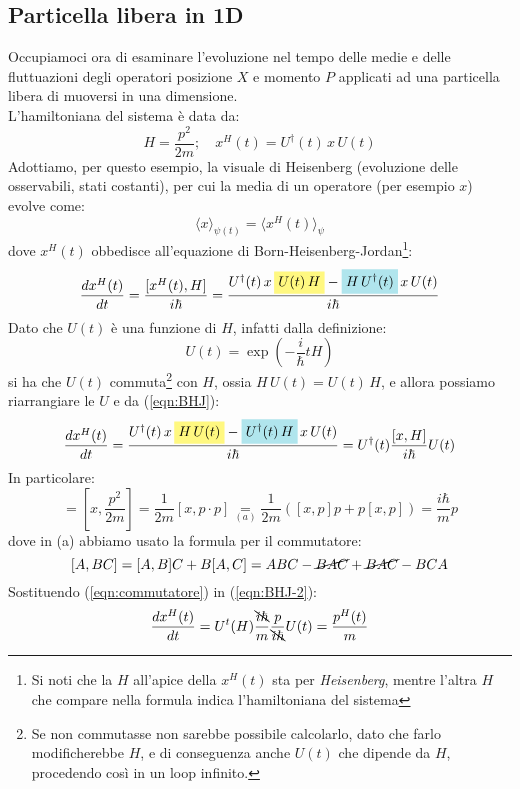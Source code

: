 \documentclass[../../FisicaTeorica.tex]{subfiles}
\begin{document}
\subsection{Particella libera in 1D}
Occupiamoci ora di esaminare l'evoluzione nel tempo delle medie e delle fluttuazioni degli operatori posizione $X$ e momento $P$ applicati ad una particella libera di muoversi in una dimensione.\\
L'hamiltoniana del sistema è data da:
\[
H=\frac{p^2}{2m};\quad x^H(t)=U^\dag(t)\,x\,U(t)
\]
Adottiamo, per questo esempio, la visuale di Heisenberg (evoluzione delle osservabili, stati costanti), per cui la media di un operatore (per esempio $x$) evolve come:
\[
\langle x \rangle_{\psi(t)}=\langle x^H(t)\rangle_\psi
\]
dove $x^H(t)$ obbedisce all'equazione di Born-Heisenberg-Jordan\footnote{Si noti che la $H$ all'apice della $x^H(t)$ sta per \textit{Heisenberg}, mentre l'altra $H$ che compare nella formula indica l'hamiltoniana del sistema}:
\begin{equation}
\frac{dx^H(t)}{dt}=\frac{[x^H(t),H]}{i\hbar} =
\frac{
U^\dag(t)\,x\,\hlc{Yellow}{U(t)\,H}-\hlc{SkyBlue}{H\,U^\dag(t)}\,x\,U(t)
}{i\hbar}
\label{eqn:BHJ}
\end{equation}
Dato che $U(t)$ è una funzione di $H$, infatti dalla definizione:
\[
U(t)=\exp\left(-\frac{i}{\hbar}tH\right)
\]
si ha che $U(t)$ commuta\footnote{Se non commutasse non sarebbe possibile calcolarlo, dato che farlo modificherebbe $H$, e di conseguenza anche $U(t)$ che dipende da $H$, procedendo così in un loop infinito.} con $H$, ossia $H\,U(t)=U(t)\,H$, e allora possiamo riarrangiare le $U$ e  da (\ref{eqn:BHJ}):
\begin{equation}
\frac{dx^H(t)}{dt}=\frac{U^\dag(t)\,x\,\hlc{Yellow}{H\,U(t)}-\hlc{SkyBlue}{U^\dag(t)\,H}\,x\,U(t)}{i\hbar} 
=U^\dag(t) \frac{[x,H]}{i\hbar}U(t)
\label{eqn:BHJ-2}
\end{equation}
In particolare:
\begin{equation}
[x,H]=\left[x,\frac{p^2}{2m}\right] = \frac{1}{2m}[x,p\cdot p]\underset{(a)}{=}\frac{1}{2m}([x,p]p+p[x,p])=\frac{i\hbar}{m}p
\label{eqn:commutatore}
\end{equation}
dove in (a) abbiamo usato la formula per il commutatore:
\[
[A,BC]=[A,B]C+B[A,C]=ABC-\cancel{BAC}+\cancel{BAC}-BCA
\]
Sostituendo (\ref{eqn:commutatore}) in (\ref{eqn:BHJ-2}):
\begin{equation}
\frac{dx^H(t)}{dt}
=U^t(H)\frac{\bcancel{i\hbar}}{m}\frac{p}{\bcancel{i\hbar}}U(t)=\frac{p^H(t)}{m}
\label{eqn:BHJ-3}
\end{equation}
\end{document}
